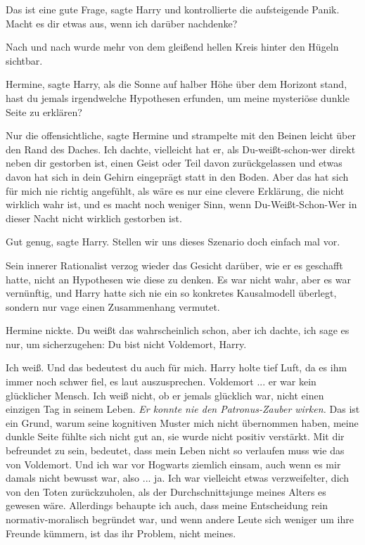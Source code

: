 \glqq{}Das ist eine gute Frage\grqq{}, sagte Harry und kontrollierte die
aufsteigende Panik. \glqq{}Macht es dir etwas aus, wenn ich darüber nachdenke?\grqq{}

Nach und nach wurde mehr von dem gleißend hellen Kreis hinter den Hügeln
sichtbar.

\glqq{}Hermine\grqq{}, sagte Harry, als die Sonne auf halber Höhe über dem
Horizont stand, \glqq{}hast du jemals irgendwelche Hypothesen erfunden, um meine
mysteriöse dunkle Seite zu erklären?\grqq{}

\glqq{}Nur die offensichtliche\grqq{}, sagte Hermine und strampelte mit den
Beinen leicht über den Rand des Daches. \glqq{}Ich dachte, vielleicht hat er, als
Du-weißt-schon-wer direkt neben dir gestorben ist, einen Geist oder Teil davon
zurückgelassen und etwas davon hat sich in dein Gehirn eingeprägt statt in den
Boden. Aber das hat sich für mich nie richtig angefühlt, als wäre es nur eine
clevere Erklärung, die nicht wirklich wahr ist, und es macht noch weniger Sinn,
wenn Du-Weißt-Schon-Wer in dieser Nacht nicht wirklich gestorben ist.\grqq{}

\glqq{}Gut genug\grqq{}, sagte Harry. \glqq{}Stellen wir uns dieses Szenario doch
einfach mal vor.\grqq{}

Sein innerer Rationalist verzog wieder das Gesicht darüber, wie er es geschafft
hatte, nicht an Hypothesen wie diese zu denken. Es war nicht wahr, aber es war
vernünftig, und Harry hatte sich nie ein so konkretes Kausalmodell überlegt,
sondern nur vage einen Zusammenhang vermutet.

Hermine nickte. \glqq{}Du weißt das wahrscheinlich schon, aber ich dachte, ich
sage es nur, um sicherzugehen: Du bist nicht Voldemort, Harry.\grqq{}

\glqq{}Ich weiß. Und das bedeutest du auch für mich.\grqq{} Harry holte tief Luft, da
es ihm immer noch schwer fiel, es laut auszusprechen. \glqq{}Voldemort ... er war
kein glücklicher Mensch. Ich weiß nicht, ob er jemals glücklich war, nicht einen
einzigen Tag in seinem Leben.\grqq{}
\emph{Er konnte nie den Patronus-Zauber wirken.}
\glqq{}Das ist ein Grund, warum seine kognitiven Muster mich nicht übernommen
haben, meine dunkle Seite fühlte sich nicht gut an, sie wurde nicht positiv
verstärkt. Mit dir befreundet zu sein, bedeutet, dass mein Leben nicht so
verlaufen muss wie das von Voldemort. Und ich war vor Hogwarts ziemlich einsam,
auch wenn es mir damals nicht bewusst war, also ... ja. Ich war vielleicht etwas
verzweifelter, dich von den Toten zurückzuholen, als der Durchschnittsjunge
meines Alters es gewesen wäre. Allerdings behaupte ich auch, dass meine
Entscheidung rein normativ-moralisch begründet war, und wenn andere Leute sich
weniger um ihre Freunde kümmern, ist das ihr Problem, nicht meines.\grqq{}

